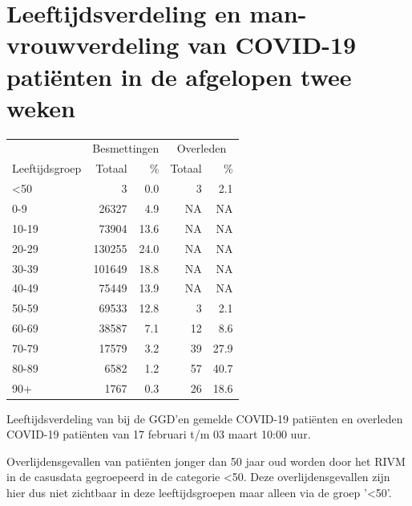 \documentclass[
  english,
  man,floatsintext]{apa6}
\begin{document}
\newpage

\hypertarget{leeftijdsverdeling-en-man-vrouwverdeling-van-covid-19-patiuxebnten-in-de-afgelopen-twee-weken}{%
\section{Leeftijdsverdeling en man-vrouwverdeling van COVID-19 patiënten in de afgelopen twee weken}\label{leeftijdsverdeling-en-man-vrouwverdeling-van-covid-19-patiuxebnten-in-de-afgelopen-twee-weken}}

\begin{table}
\centering\begingroup\fontsize{11}{13}\selectfont

\begin{threeparttable}
\begin{tabular}{lrrrr}
\toprule
\multicolumn{1}{c}{ } & \multicolumn{2}{c}{Besmettingen} & \multicolumn{2}{c}{Overleden} \\
\cmidrule(l{3pt}r{3pt}){2-3} \cmidrule(l{3pt}r{3pt}){4-5}
Leeftijdsgroep & Totaal & \% & Totaal & \%\\
\midrule
<50 & 3 & 0.0 & 3 & 2.1\\
0-9 & 26327 & 4.9 & NA & NA\\
10-19 & 73904 & 13.6 & NA & NA\\
20-29 & 130255 & 24.0 & NA & NA\\
30-39 & 101649 & 18.8 & NA & NA\\
40-49 & 75449 & 13.9 & NA & NA\\
50-59 & 69533 & 12.8 & 3 & 2.1\\
60-69 & 38587 & 7.1 & 12 & 8.6\\
70-79 & 17579 & 3.2 & 39 & 27.9\\
80-89 & 6582 & 1.2 & 57 & 40.7\\
90+ & 1767 & 0.3 & 26 & 18.6\\
\bottomrule
\end{tabular}
\begin{tablenotes}
\item[1] Leeftijdsverdeling van bij de GGD’en gemelde COVID-19 patiënten en overleden COVID-19 patiënten van 17 februari t/m 03 maart 10:00 uur.
\item[2] Overlijdensgevallen van patiënten jonger dan 50 jaar oud worden door het RIVM in de casusdata gegroepeerd in de categorie <50. Deze overlijdensgevallen zijn hier dus niet zichtbaar in deze leeftijdsgroepen maar alleen via de groep '<50'.
\end{tablenotes}
\end{threeparttable}
\endgroup{}
\end{table}
\end{document}
